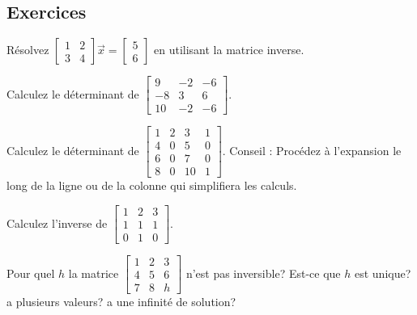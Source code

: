 \subsection{Exercices}

\begin{exercise}
Résolvez
$\left[ \begin{smallmatrix}
1 & 2 \\
3 & 4 
\end{smallmatrix} \right] \vec{x} =
\left[ \begin{smallmatrix}
5 \\
6
\end{smallmatrix} \right]$ en utilisant la matrice inverse.
\end{exercise}

\begin{exercise}
Calculez le déterminant de
$\left[ \begin{smallmatrix}
9 & -2 & -6 \\
-8 & 3 & 6 \\
10 & -2 & -6
\end{smallmatrix} \right]$.
\end{exercise}

\begin{exercise}
Calculez le déterminant de
$\left[ \begin{smallmatrix}
1 & 2 & 3 & 1 \\
4 & 0 & 5 & 0 \\
6 & 0 & 7 & 0 \\
8 & 0 & 10 & 1
\end{smallmatrix} \right]$.  Conseil : Procédez à l’expansion le long de la ligne ou de la colonne qui simplifiera les calculs.
\end{exercise}

\begin{exercise}
Calculez l'inverse de
$\left[ \begin{smallmatrix}
1 & 2 & 3 \\
1 & 1 & 1 \\
0 & 1 & 0
\end{smallmatrix} \right]$.
\end{exercise}

\begin{exercise}
Pour quel $h$ la matrice
$\left[ \begin{smallmatrix}
1 & 2 & 3 \\
4 & 5 & 6 \\
7 & 8 & h
\end{smallmatrix} \right]$
n’est pas inversible? Est-ce que $h$ est unique? a plusieurs valeurs? a une infinité de solution?
\end{exercise}

